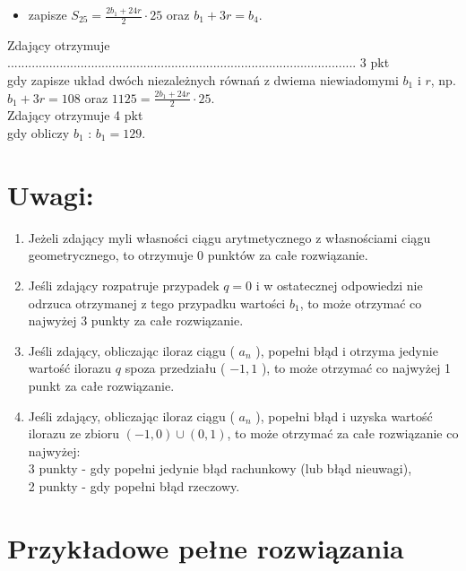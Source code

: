 \documentclass[10pt]{article}
\begin{document}
\begin{itemize}
  \item zapisze $S_{25}=\frac{2 b_{1}+24 r}{2} \cdot 25$ oraz $b_{1}+3 r=b_{4}$.
\end{itemize}

Zdający otrzymuje .................................................................................................... 3 pkt\\
gdy zapisze układ dwóch niezależnych równań z dwiema niewiadomymi $b_{1}$ i $r$, np.\\
$b_{1}+3 r=108$ oraz $1125=\frac{2 b_{1}+24 r}{2} \cdot 25$.\\
Zdający otrzymuje 4 pkt\\
gdy obliczy $b_{1}$ : $b_{1}=129$.

\section*{Uwagi:}
\begin{enumerate}
  \item Jeżeli zdający myli własności ciągu arytmetycznego z własnościami ciągu geometrycznego, to otrzymuje 0 punktów za całe rozwiązanie.
  \item Jeśli zdający rozpatruje przypadek $q=0$ i w ostatecznej odpowiedzi nie odrzuca otrzymanej z tego przypadku wartości $b_{1}$, to może otrzymać co najwyżej 3 punkty za całe rozwiązanie.
  \item Jeśli zdający, obliczając iloraz ciągu ( $a_{n}$ ), popełni błąd i otrzyma jedynie wartość ilorazu $q$ spoza przedziału ( $-1,1$ ), to może otrzymać co najwyżej 1 punkt za całe rozwiązanie.
  \item Jeśli zdający, obliczając iloraz ciągu ( $a_{n}$ ), popełni błąd i uzyska wartość ilorazu ze zbioru $(-1,0) \cup(0,1)$, to może otrzymać za całe rozwiązanie co najwyżej:\\
3 punkty - gdy popełni jedynie błąd rachunkowy (lub błąd nieuwagi),\\
2 punkty - gdy popełni błąd rzeczowy.
\end{enumerate}

\section*{Przykładowe pełne rozwiązania}
\end{document}
